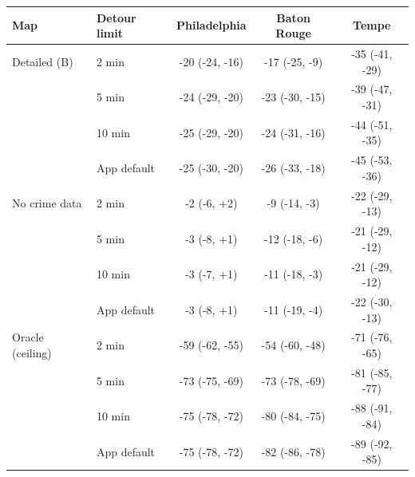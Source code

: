 \begin{tabular}{llccc}
\toprule
Map & Detour limit & Philadelphia & Baton Rouge & Tempe \\
\midrule
Detailed (B) & 2 min & -20 (-24, -16) & -17 (-25, -9) & -35 (-41, -29) \\
 & 5 min & -24 (-29, -20) & -23 (-30, -15) & -39 (-47, -31) \\
 & 10 min & -25 (-29, -20) & -24 (-31, -16) & -44 (-51, -35) \\
 & App default & -25 (-30, -20) & -26 (-33, -18) & -45 (-53, -36) \\
\midrule
No crime data & 2 min & -2 (-6, +2) & -9 (-14, -3) & -22 (-29, -13) \\
 & 5 min & -3 (-8, +1) & -12 (-18, -6) & -21 (-29, -12) \\
 & 10 min & -3 (-7, +1) & -11 (-18, -3) & -21 (-29, -12) \\
 & App default & -3 (-8, +1) & -11 (-19, -4) & -22 (-30, -13) \\
\midrule
Oracle (ceiling) & 2 min & -59 (-62, -55) & -54 (-60, -48) & -71 (-76, -65) \\
 & 5 min & -73 (-75, -69) & -73 (-78, -69) & -81 (-85, -77) \\
 & 10 min & -75 (-78, -72) & -80 (-84, -75) & -88 (-91, -84) \\
 & App default & -75 (-78, -72) & -82 (-86, -78) & -89 (-92, -85) \\
\bottomrule
\end{tabular}
